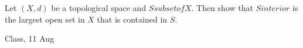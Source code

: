 \begin{samepage}
\begin{ex}
Let $(X,d)$ be a topological space and $S subset of X$. Then show that $S interior$ is the largest open set in $X$ that is contained in $S$.
\end{ex}
\begin{source}
Class, 11 Aug
\end{source}
\end{samepage}
